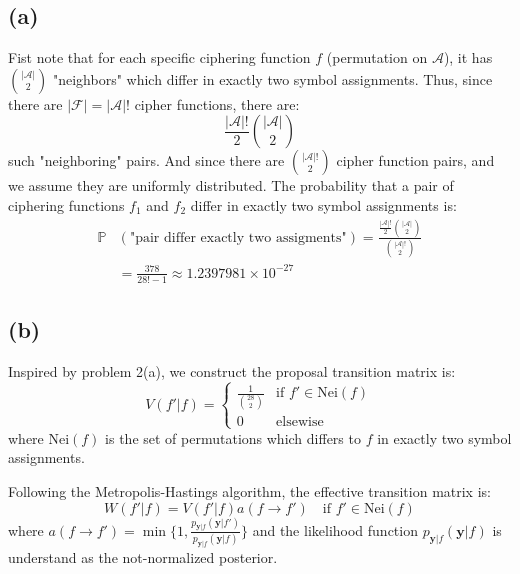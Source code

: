 \documentclass[12pt,aps,pre,reprint]{revtex4-1}
\begin{document}
\subsection{(a)}
Fist note that for each specific ciphering function $f$ (permutation on $\mathcal{A}$), it has ${|\mathcal{A}|\choose2}$ "neighbors" which differ in exactly two symbol assignments. Thus, since there are $|\mathcal{F}| = |\mathcal{A}|!$ cipher functions, there are:
\begin{equation}
	\frac{|\mathcal{A}|!}{2}{|\mathcal{A}|\choose2}
\end{equation}
such "neighboring" pairs. And since there are ${|\mathcal{A}|!\choose2}$ cipher function pairs, and we assume they are uniformly distributed. The probability that a pair of ciphering functions $f_1$ and $f_2$ differ in exactly two symbol assignments is:
\begin{equation}
\begin{split}
	\mathbb{P}&(\text{"pair differ  exactly two assigments"}) = \frac{\frac{|\mathcal{A}|!}{2}{|\mathcal{A}|\choose2}}{{|\mathcal{A}|!\choose2}} \\ & = \frac{378}{28!-1} \approx 1.2397981\times{10}^{-27}
\end{split}
\end{equation}

\subsection{(b)}
Inspired by problem 2(a), we construct the proposal transition matrix is:
\begin{equation}
V(f'|f) =
\begin{cases}
\frac{1}{{28\choose2}} & \text{if } f'\in \text{Nei}(f) \\
0 & \text{elsewise}
\end{cases}
\end{equation}
where $\text{Nei}(f)$ is the set of permutations which differs to $f$ in exactly two symbol assignments.

Following the Metropolis-Hastings algorithm, the effective transition matrix is:
\begin{equation}
	W(f'|f) = V(f'|f)a(f\to f')\quad\text{if }f'\in \text{Nei}(f)
\end{equation}
where $a(f\to f') = \min\big\{1, \frac{p_{\mathbf{y}|f}(\mathbf{y}|f')}{p_{\mathbf{y}|f}(\mathbf{y}|f)}\big\}$ and the likelihood function $p_{\mathbf{y}|f}(\mathbf{y}|f)$ is understand as the not-normalized posterior.
\end{document}
